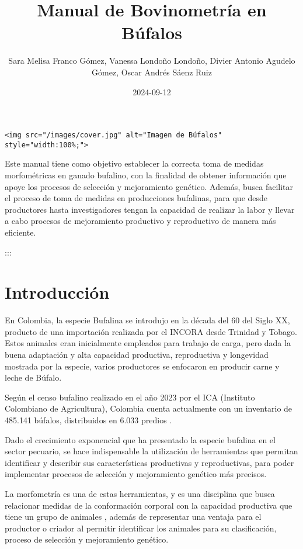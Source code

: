\documentclass[
]{book}
\title{Manual de Bovinometría en Búfalos}
\author{Sara Melisa Franco Gómez, Vanessa Londoño Londoño, Divier Antonio Agudelo Gómez, Oscar Andrés Sáenz Ruiz}
\date{2024-09-12}
\begin{document}
\maketitle

{
\setcounter{tocdepth}{1}
\tableofcontents
}
\begin{verbatim}
<img src="/images/cover.jpg" alt="Imagen de Búfalos" style="width:100%;">
\end{verbatim}

Este manual tiene como objetivo establecer la correcta
toma de medidas morfométricas en ganado bufalino,
con la finalidad de obtener información que apoye los
procesos de selección y mejoramiento genético.
Además, busca facilitar el proceso de toma de medidas
en producciones bufalinas, para que desde productores hasta
investigadores tengan la capacidad de realizar la labor y llevar
a cabo procesos de mejoramiento productivo y reproductivo de manera más
eficiente.

:::

\chapter{Introducción}\label{introducciuxf3n}

En Colombia, la especie Bufalina se introdujo en la década del 60 del Siglo XX, producto de una importación realizada por el INCORA desde Trinidad y Tobago. Estos animales eran inicialmente empleados para trabajo de carga, pero dada la buena adaptación y alta capacidad productiva, reproductiva y longevidad mostrada por la especie, varios productores se enfocaron en producir carne y leche de Búfalo.

Según el censo bufalino realizado en el año 2023 por el ICA (Instituto Colombiano de Agricultura), Colombia cuenta actualmente con un inventario de 485.141 búfalos, distribuidos en 6.033 predios \citep{ICA2022}.

Dado el crecimiento exponencial que ha presentado la especie bufalina en el sector pecuario, se hace indispensable la utilización de herramientas que permitan identificar y describir sus características productivas y reproductivas, para poder implementar procesos de selección y mejoramiento genético más precisos.

La morfometría es una de estas herramientas, y es una disciplina que busca relacionar medidas de la conformación corporal con la capacidad productiva que tiene un grupo de animales \citep{Cardenas2018}, además de representar una ventaja para el productor o criador al permitir identificar los animales para su clasificación, proceso de selección y mejoramiento genético.
\end{document}
